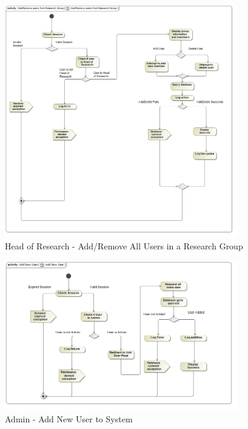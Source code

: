 \documentclass{article}
\begin{document}
			\begin{figure}[H]
				\includegraphics[width=4in, center]{../Diagrams/Process Specifications/User subsystem/Add_Remove Users from Research Group.jpg}
				\caption{Head of Research - Add/Remove All Users in a Research Group}
			\end{figure}
			\begin{figure}[H]
				\includegraphics[width=4in, center]{../Diagrams/Process Specifications/User subsystem/Add New User.jpg}
				\caption{Admin - Add New User to System}
			\end{figure}
\end{document}

